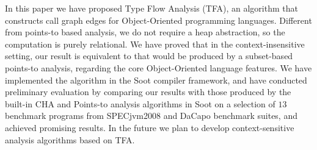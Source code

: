\documentclass{llncs}
\begin{document}
In this paper we have proposed Type Flow Analysis (TFA), an algorithm that constructs call graph edges for Object-Oriented programming languages. Different from points-to based analysis, we do not require a heap abstraction, so the computation is purely relational. We have proved that in the context-insensitive setting, our result is equivalent to that would be produced by a subset-based points-to analysis, regarding the core Object-Oriented language features. We have implemented the algorithm in the Soot compiler framework, and have conducted preliminary evaluation by comparing our results with those produced by the built-in CHA and Points-to analysis algorithms in Soot on a selection of $13$ benchmark programs from SPECjvm2008 and DaCapo benchmark suites, and achieved promising results. In the future we plan to develop context-sensitive analysis algorithms based on TFA.



\end{document}
